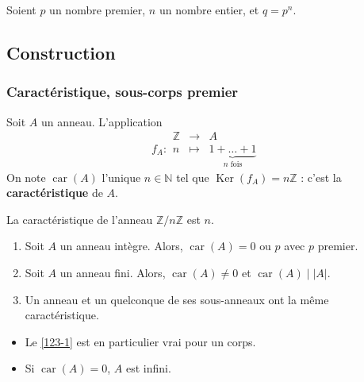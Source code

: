 




  Soient $p$ un nombre premier, $n$ un nombre entier, et $q = p^n$.

  \subsection{Construction}

  \subsubsection{Caractéristique, sous-corps premier}


  \begin{definition}
    Soit $A$ un anneau. L'application
    \[
    f_A :
    \begin{array}{ccc}
      \mathbb{Z} &\rightarrow& A \\
      n &\mapsto& \underbrace{1 + \dots + 1}_{n \text{ fois}}
    \end{array}
    \]
    On note $\operatorname{car}(A)$ l'unique $n \in \mathbb{N}$ tel que $\operatorname{Ker}(f_A) = n\mathbb{Z}$ : c'est la \textbf{caractéristique} de $A$.
  \end{definition}

  \begin{example}
    La caractéristique de l'anneau $\mathbb{Z}/n\mathbb{Z}$ est $n$.
  \end{example}

  \begin{proposition}
    \begin{enumerate}[label={\bfseries(\roman*)}]
      \item \label{123-1} Soit $A$ un anneau intègre. Alors, $\operatorname{car}(A) = 0 \text{ ou } p$ avec $p$ premier.
      \item Soit $A$ un anneau fini. Alors, $\operatorname{car}(A) \neq 0$ et $\operatorname{car}(A) \mid |A|$.
      \item Un anneau et un quelconque de ses sous-anneaux ont la même caractéristique.
    \end{enumerate}
  \end{proposition}

  \begin{remark}
    \begin{itemize}
      \item Le \cref{123-1} est en particulier vrai pour un corps.
      \item Si $\operatorname{car}(A) = 0$, $A$ est infini.
    \end{itemize}
  \end{remark}

